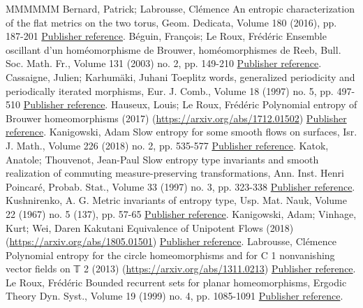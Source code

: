 \documentclass[11pt]{article}
\theoremstyle{definition}
\numberwithin{equation}{section}
\numberwithin{figure}{section}
\numberwithin{table}{section}
\begin{document}
\begin{thebibliography}{MMMMMM}
 Bernard, Patrick; Labrousse, Clémence An entropic characterization of the flat metrics on the two torus, Geom. Dedicata, Volume 180 (2016), pp. 187-201 \href{https://ahl.centre-mersenne.org/item/AHL_2019__2__39_0/#BerLab16}{Publisher reference}.
 Béguin, François; Le Roux, Frédéric Ensemble oscillant d’un homéomorphisme de Brouwer, homéomorphismes de Reeb, Bull. Soc. Math. Fr., Volume 131 (2003) no. 2, pp. 149-210 \href{https://ahl.centre-mersenne.org/item/AHL_2019__2__39_0/#BegLer03}{Publisher reference}.
 Cassaigne, Julien; Karhumäki, Juhani Toeplitz words, generalized periodicity and periodically iterated morphisms, Eur. J. Comb., Volume 18 (1997) no. 5, pp. 497-510 \href{https://ahl.centre-mersenne.org/item/AHL_2019__2__39_0/#CasKar97}{Publisher reference}.
 Hauseux, Louis; Le Roux, Frédéric Polynomial entropy of Brouwer homeomorphisms (2017) (\url{https://arxiv.org/abs/1712.01502}) \href{https://ahl.centre-mersenne.org/item/AHL_2019__2__39_0/#englishversion}{Publisher reference}.
 Kanigowski, Adam Slow entropy for some smooth flows on surfaces, Isr. J. Math., Volume 226 (2018) no. 2, pp. 535-577 \href{https://ahl.centre-mersenne.org/item/AHL_2019__2__39_0/#Kan18}{Publisher reference}.
 Katok, Anatole; Thouvenot, Jean-Paul Slow entropy type invariants and smooth realization of commuting measure-preserving transformations, Ann. Inst. Henri Poincaré, Probab. Stat., Volume 33 (1997) no. 3, pp. 323-338 \href{https://ahl.centre-mersenne.org/item/AHL_2019__2__39_0/#KatTho97}{Publisher reference}.
 Kushnirenko, A. G. Metric invariants of entropy type, Usp. Mat. Nauk, Volume 22 (1967) no. 5 (137), pp. 57-65 \href{https://ahl.centre-mersenne.org/item/AHL_2019__2__39_0/#Kus67}{Publisher reference}.
 Kanigowski, Adam; Vinhage, Kurt; Wei, Daren Kakutani Equivalence of Unipotent Flows (2018) (\url{https://arxiv.org/abs/1805.01501}) \href{https://ahl.centre-mersenne.org/item/AHL_2019__2__39_0/#KVW18}{Publisher reference}.
 Labrousse, Clémence Polynomial entropy for the circle homeomorphisms and for C 1  nonvanishing vector fields on 𝕋 2  (2013) (\url{https://arxiv.org/abs/1311.0213}) \href{https://ahl.centre-mersenne.org/item/AHL_2019__2__39_0/#Lab13}{Publisher reference}.
 Le Roux, Frédéric Bounded recurrent sets for planar homeomorphisms, Ergodic Theory Dyn. Syst., Volume 19 (1999) no. 4, pp. 1085-1091 \href{https://ahl.centre-mersenne.org/item/AHL_2019__2__39_0/#Ler99}{Publisher reference}.

\end{thebibliography}
\end{document}
